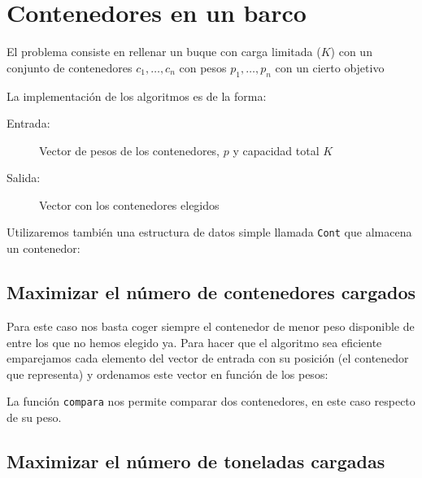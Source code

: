 
\section{Contenedores en un barco}

El problema consiste en rellenar un buque con carga limitada ($K$) con un conjunto
de contenedores $c_1,\dots, c_n$ con pesos $p_1, \dots, p_n$ con un cierto objetivo

La implementación de los algoritmos es de la forma:
\begin{description}
 \item[Entrada:] Vector de pesos de los contenedores, $p$ y capacidad total $K$
 \item[Salida:] Vector con los contenedores elegidos
\end{description}

Utilizaremos también una estructura de datos simple llamada \texttt{Cont} que almacena un
contenedor:



\subsection{Maximizar el número de contenedores cargados}

Para este caso nos basta coger siempre el contenedor de menor peso disponible de entre los
que no hemos elegido ya.
Para hacer que el algoritmo sea eficiente emparejamos cada elemento
del vector de entrada con su posición (el contenedor que representa)
y ordenamos este vector en función de los pesos:



La función \texttt{compara} nos permite comparar dos contenedores, en este caso respecto de su peso.

\subsection{Maximizar el número de toneladas cargadas}

